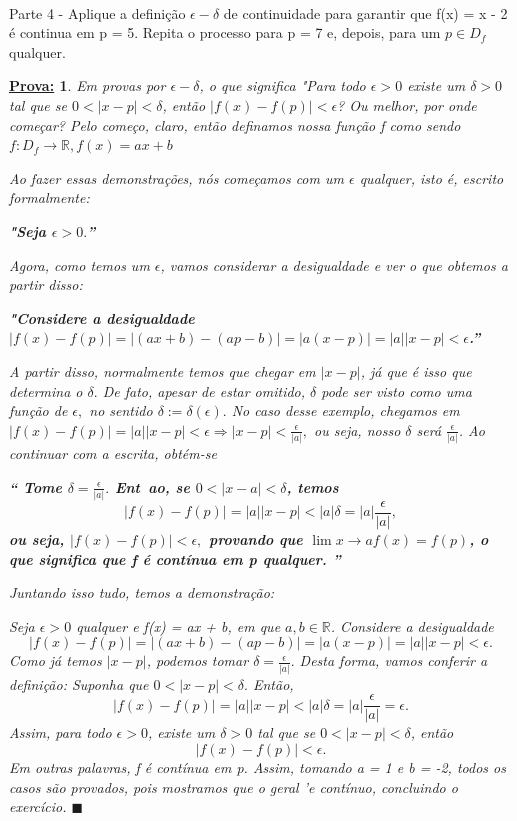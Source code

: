 \documentclass{article}
\newtheorem*{proof*}{\underline{Prova:}}
\renewcommand\qedsymbol{$\blacksquare$}
\begin{document}
\paragraph{} Parte 4 - Aplique a defini\c c\~ao $\epsilon-\delta$ de continuidade para garantir que f(x) = x - 2 \'e continua em p = 5. Repita o processo para p = 7 e, depois, para um $p\in{D_f}$ qualquer.
\begin{proof*}
Em provas por $\epsilon-\delta$, o que significa "Para todo $\epsilon > 0$ existe um $\delta > 0$ tal que se $0 < |x - p| < \delta$, ent\~ao $|f(x) - f(p)| < \epsilon$? Ou melhor, por onde come\c car? Pelo come\c co, claro, ent\~ao definamos nossa fun\c c\~ao f como sendo $f:D_f\rightarrow\mathbb{R}, f(x) = ax + b$

Ao fazer essas demonstra\c c\~oes, n\'os come\c camos com um $\epsilon$ qualquer, isto \'e, escrito formalmente:

\textbf{"Seja $\epsilon > 0.$''}

Agora, como temos um $\epsilon$, vamos considerar a desigualdade e ver o que obtemos a partir disso:

\textbf{"Considere a desigualdade $|f(x) - f(p)| = |(ax + b) - (ap - b)| = |a(x - p)| = |a||x - p|< \epsilon$.'' }

A partir disso, normalmente temos que chegar em $|x - p|$, j\'a que \'e isso que determina o $\delta.$ De fato, apesar de estar omitido, $\delta$ pode ser visto como uma fun\c c\~ao de $\epsilon,$ no sentido $\delta := \delta(\epsilon).$
No caso desse exemplo, chegamos em $|f(x) - f(p)| = |a||x - p| < \epsilon \Rightarrow |x - p| < \frac{\epsilon}{|a|},$ ou seja, nosso $\delta$ ser\'a $\frac{\epsilon}{|a|}$. Ao continuar com a escrita, obt\'em-se

\textbf{``
Tome $\delta = \frac{\epsilon}{|a|}.$ Ent~ao, se $0 < |x - a| < \delta$, temos
$$
|f(x) - f(p)| = |a||x - p| < |a|\delta = |a|\frac{\epsilon}{|a|},
$$
ou seja, $|f(x) - f(p)| < \epsilon,$ provando que $\lim{x\to{a}} f(x) = f(p)$, o que significa que f \'e cont\'inua em p qualquer.
''}

Juntando isso tudo, temos a demonstra\c c\~ao:

Seja $\epsilon > 0$ qualquer e f(x) = ax + b, em que $a, b\in\mathbb{R}$. Considere a desigualdade 
$$
|f(x) - f(p)| = |(ax + b) - (ap - b)| = |a(x - p)| = |a||x - p|< \epsilon.
$$
Como j\'a temos $|x - p|$, podemos tomar $\delta = \frac{\epsilon}{|a|}.$ Desta forma, vamos conferir a defini\c c\~ao: Suponha que $0 < |x - p| < \delta.$ Ent\~ao, 
$$
|f(x) - f(p)| = |a||x - p| < |a|\delta = |a|\frac{\epsilon}{|a|} = \epsilon.
$$
Assim, para todo $\epsilon > 0$, existe um $\delta > 0$ tal que se $0 < |x - p| < \delta$, ent\~ao
$$
|f(x) - f(p)| < \epsilon.
$$
Em outras palavras, f \'e cont\'inua em p. Assim, tomando a = 1 e b = -2, todos os casos s\~ao provados, pois mostramos que o geral 'e cont\'inuo, concluindo o exerc\'icio.
\qedsymbol
\end{proof*}
\end{document}
